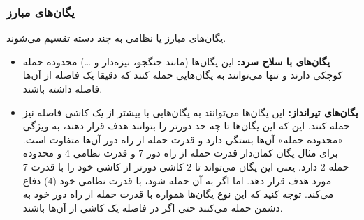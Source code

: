 \documentclass[]{article}
\begin{document}
\subsubsection*{{\titr یگان‌های مبارز}}
یگان‌های مبارز یا نظامی به چند دسته تقسیم می‌شوند.
\begin{itemize}

\item \noindent \textbf{یگان‌های با سلاح سرد:}
این یگان‌ها (مانند جنگجو، نیزه‌دار و …) محدوده حمله کوچکی دارند و تنها می‌توانند به یگان‌هایی حمله کنند که دقیقا یک فاصله از آن‌ها فاصله داشته باشند.
\item \noindent \textbf{یگان‌های تیرانداز:}
این یگان‌ها می‌توانند به یگان‌هایی با بیشتر از یک کاشی فاصله نیز حمله کنند. این که این یگان‌ها تا چه حد دورتر را بتوانند هدف قرار دهند، به ویژگی «محدوده حمله» آن‌ها بستگی دارد و قدرت حمله از راه دور آن‌ها متفاوت است. برای مثال یگان کمان‌دار قدرت حمله از راه دور 7 و قدرت نظامی 4 و محدوده حمله 2 دارد. یعنی این یگان می‌تواند تا 2 کاشی دورتر از کاشی خود را با قدرت 7 مورد هدف قرار دهد. اما اگر به آن حمله شود، با قدرت نظامی خود (4) دفاع می‌کند. توجه کنید که این نوع یگان‌ها همواره با قدرت حمله از راه دور خود به دشمن حمله می‌کنند حتی اگر در فاصله یک کاشی از آن‌ها باشند.
\end{itemize}
\end{document}
